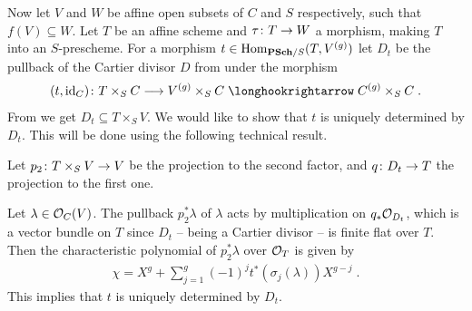 \documentclass[a4paper,parskip=half,numbers=enddot, DIV=12]{scrreprt}
\begin{document}
Now let $V$ and $W$ be affine open subsets of $C$ and $S$ respectively, such that $f(V)\subseteq W$. Let $T$ be an affine scheme and $\tau\colon T\morphism W$ a morphism, making $T$ into an $S$-prescheme. For a morphism $t\in \Hom_{\cat{PSch}/S}(T,V^{(g)})$ let $D_t$ be the pullback of the Cartier divisor $D$ from  under the morphism
\begin{align*}
	(t,\id_C)\colon T\times_SC\morphism V^{(g)}\times_SC\monomorphism C^{(g)}\times_SC\;.
\end{align*}
From  we get $D_t\subseteq T\times_SV$. We would like to show that $t$ is uniquely determined by $D_t$. This will be done using the following technical result.
\setcounter{thm}{11}
\begin{thm}[continuation]
	Let $p_2\colon T\times_SV\morphism V$ be the projection to the second factor, and $q\colon D_t\morphism T$ the projection to the first one.
	\begin{alphanumerate}\setcounter{enumi}{4}
		\item Let $\lambda\in\mathcal{O}_C(V)$. The pullback $p_2^*\lambda$ of $\lambda$ acts by multiplication on $q_*\mathcal{O}_{D_t}$, which is a vector bundle on $T$ since $D_t$ -- being a Cartier divisor -- is finite flat over $T$. Then the characteristic polynomial of $p_2^*\lambda$ over $\mathcal{O}_T$ is given by
		\begin{align*}
			\chi=X^g+\sum_{j=1}^g(-1)^jt^*(\sigma_j(\lambda))X^{g-j}\;.
		\end{align*}
		This implies that $t$ is uniquely determined by $D_t$.
	\end{alphanumerate}
\end{thm}
\end{document}
